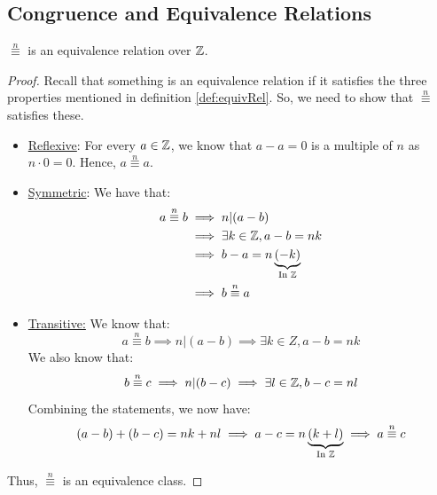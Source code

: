\documentclass[letterpaper]{article}
\begin{document}
\subsection{Congruence and Equivalence Relations}
\begin{lemma}{}{}
    $\overset{n}{\equiv}$ is an equivalence relation over $\mathbb{Z}$. 
\end{lemma}
\begin{framed}
    \begin{proof}
        Recall that something is an equivalence relation if it satisfies the three properties mentioned in definition \ref{def:equivRel}. So, we need to show that $\overset{n}{\equiv}$ satisfies these. 
        \begin{itemize}
            \item \underline{Reflexive}: For every $a \in \mathbb{Z}$, we know that $a - a = 0$ is a multiple of $n$ as $n \cdot 0 = 0$. Hence, $a \overset{n}{\equiv} a$. 
            \item \underline{Symmetric}: We have that: 
            \begin{equation*}
                \begin{aligned}
                    a \overset{n}{\equiv} b &\implies n | (a - b) \\ 
                        &\implies \exists k \in \mathbb{Z}, a - b = nk \\ 
                        &\implies b - a = n\underbrace{(-k)}_{\text{In } \mathbb{Z}} \\ 
                        &\implies b \overset{n}{\equiv} a
                \end{aligned}
            \end{equation*}
    
            \item \underline{Transitive:} We know that:
            \[a \overset{n}{\equiv} b \implies n | (a - b) \implies \exists k \in Z, a - b = nk\]
            We also know that:
            \[b \overset{n}{\equiv} c \implies n | (b - c) \implies \exists l \in \mathbb{Z}, b - c = nl\]
            Combining the statements, we now have:
            \[(a - b) + (b - c) = nk + nl \implies a - c = n\underbrace{(k + l)}_{\text{In } \mathbb{Z}} \implies a \overset{n}{\equiv} c\]
        \end{itemize}
        Thus, $\overset{n}{\equiv}$ is an equivalence class. 
    \end{proof}
\end{framed}
\end{document}
